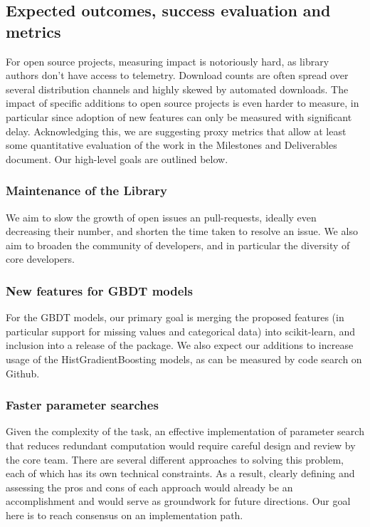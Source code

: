 \documentclass[11pt]{article}  %
\begin{document}
\subsection{Expected outcomes, success evaluation and metrics}
For open source projects, measuring impact is notoriously hard, as library authors don't have access to telemetry. Download counts are often spread over several distribution channels and highly skewed by automated downloads. The impact of specific additions to open source projects is even harder to measure, in particular since adoption of new features can only be measured with significant delay. Acknowledging this, we are suggesting proxy metrics that allow at least some quantitative evaluation of the work in the Milestones and Deliverables document. Our high-level goals are outlined below.

\subsubsection{Maintenance of the Library}
We aim to slow the growth of open issues an pull-requests, ideally even decreasing their number, and shorten the time taken to resolve an issue. We also aim to broaden the community of developers, and in particular the diversity of core developers.

\subsubsection{New features for GBDT models}

For the GBDT models, our primary goal is merging the proposed
features (in particular support for missing values and categorical data) into scikit-learn, and inclusion into a release of the package. We also expect our additions to increase usage of the HistGradientBoosting models, as can be measured by code search on Github.

\subsubsection{Faster parameter searches}

Given the complexity of the
task, an effective implementation of parameter search that reduces redundant computation would require careful design and review by the core team. There
are several different approaches to solving this problem, each of which
has its own technical constraints. As a result, clearly defining and
assessing the pros and cons of each approach would already be an
accomplishment and would serve as groundwork for future directions.
Our goal here is to reach consensus on an implementation path.
\end{document}
